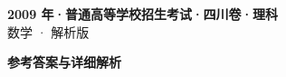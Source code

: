 \documentclass[zihao=-4, a4paper]{ctexart}
\begin{document}
\begin{center}
  {\Large\bfseries 2009 年·普通高等学校招生考试·四川卷·理科}\\[4pt]
  {\large 数学 · 解析版}
\end{center}
\medskip
{}

\clearpage
{}
\begin{center}{\Large\bfseries 参考答案与详细解析}\end{center}
\medskip

\end{document}
